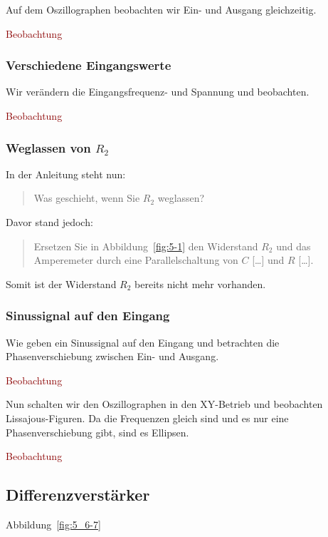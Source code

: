 Auf dem Oszillographen beobachten wir Ein- und Ausgang gleichzeitig.

\textcolor{darkred}{Beobachtung}

\subsubsection{Verschiedene Eingangswerte}

Wir verändern die Eingangsfrequenz- und Spannung und beobachten.

\textcolor{darkred}{Beobachtung}

\subsubsection{Weglassen von $R_2$}

In der Anleitung steht nun:

\begin{quote}
	Was geschieht, wenn Sie $R_2$ weglassen?
\end{quote}

Davor stand jedoch:

\begin{quote}
	Ersetzen Sie in Abbildung~\ref{fig:5-1} den Widerstand $R_2$ und das
	Amperemeter durch eine Parallelschaltung von $C$ […] und $R$ […].
\end{quote}

Somit ist der Widerstand $R_2$ bereits nicht mehr vorhanden.

\subsubsection{Sinussignal auf den Eingang}

Wie geben ein Sinussignal auf den Eingang und betrachten die Phasenverschiebung
zwischen Ein- und Ausgang.

\textcolor{darkred}{Beobachtung}

Nun schalten wir den Oszillographen in den XY-Betrieb und beobachten
Lissajous-Figuren. Da die Frequenzen gleich sind und es nur eine
Phasenverschiebung gibt, sind es Ellipsen.

\textcolor{darkred}{Beobachtung}

\FloatBarrier
\subsection{Differenzverstärker}

Abbildung~\ref{fig:5_6-7}

